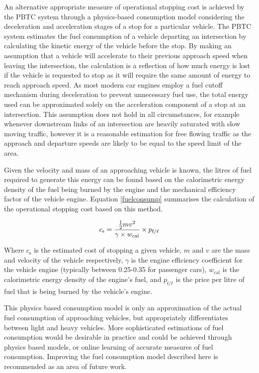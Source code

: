 An alternative appropriate measure of operational stopping cost is achieved by the PBTC system through a physics-based consumption model considering the deceleration and acceleration stages of a stop for a particular vehicle. The PBTC system estimates the fuel consumption of a vehicle departing an intersection by calculating the kinetic energy of the vehicle before the stop. By making an assumption that a vehicle will accelerate to their previous approach speed when leaving the intersection, the calculation is a reflection of how much energy is lost if the vehicle is requested to stop as it will require the same amount of energy to reach approach speed. As most modern car engines employ a fuel cutoff mechanism during deceleration to prevent unnecessary fuel use, the total energy used can be approximated solely on the acceleration component of a stop at an intersection. This assumption does not hold in all circumstances, for example whenever downstream links of an intersection are heavily saturated with slow moving traffic, however it is a reasonable estimation for free flowing traffic as the approach and departure speeds are likely to be equal to the speed limit of the area. 

Given the velocity and mass of an approaching vehicle is known, the litres of fuel required to generate this energy can be found based on the calorimetric energy density of the fuel being burned by the engine and the mechanical efficiency factor of the vehicle engine. Equation \ref{fuelconsump} summarises the calculation of the operational stopping cost based on this method.

\begin{align}
	\centering
		c_\text{s} = {\frac{\frac{1}{2}m{v}^{2} }{\gamma \times w_\text{cal}}} \times {p_{\text{f/}\ell}}
	\label{fuelconsump}
\end{align}

Where $c_\text{s}$ is the estimated cost of stopping a given vehicle, $m$ and $v$ are the mass and velocity of the vehicle respectively, $\gamma$ is the engine efficiency coefficient for the vehicle engine (typically between 0.25-0.35 for passenger cars), $w_\text{cal}$ is the calorimetric energy density of the engine's fuel, and $p_{\text{f/}\ell}$ is the price per litre of fuel that is being burned by the vehicle's engine.

This physics based consumption model is only an approximation of the actual fuel consumption of approaching vehicles, but appropriately differentiates between light and heavy vehicles. More sophisticated estimations of fuel consumption would be desirable in practice and could be achieved through physics based models, or online learning of accurate measures of fuel consumption. Improving the fuel consumption model described here is recommended as an area of future work. 

